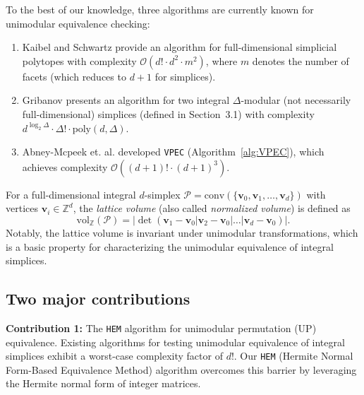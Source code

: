 \documentclass[reqno, 12pt]{article}
\theoremstyle{mydefinition}
\theoremstyle{myremark}
\numberwithin{algorithm}{section}
\begin{document}
To the best of our knowledge, three algorithms are currently known for unimodular equivalence checking:
\begin{enumerate}
    \item Kaibel and Schwartz \cite[Proposition 4]{Kaibel} provide an algorithm for full-dimensional simplicial polytopes with complexity $\mathcal O(d!\cdot d^2\cdot m^2)$, where $m$ denotes the number of facets (which reduces to $d+1$ for simplices).
    \item Gribanov \cite[Theorem 2]{Gribanov} presents an algorithm for two integral $\Delta$-modular (not necessarily full-dimensional) simplices (defined in Section~3.1) with complexity $d^{\log_2 \Delta} \cdot \Delta ! \cdot \mathrm{poly}(d,\Delta)$.
    \item Abney-Mcpeek et. al. \cite{Abney-Mcpeek} developed \texttt{VPEC} (Algorithm~\ref{alg:VPEC}), which achieves complexity $\mathcal O((d+1)!\cdot (d+1)^3)$.
\end{enumerate}


For a full-dimensional integral \( d \)-simplex \( \mathcal P = \text{conv}(\{ \mathbf{v}_0, \mathbf{v}_1, \dots, \mathbf{v}_d \}) \) with vertices \( \mathbf{v}_i \in \mathbb{Z}^d \), the \emph{lattice volume} (also called \emph{normalized volume}) is defined as
\[
\text{vol}_{\mathbb{Z}}(\mathcal P) = \left| \det\left( \mathbf{v}_1 - \mathbf{v}_0 | \mathbf{v}_2 - \mathbf{v}_0 | \dots | \mathbf{v}_d - \mathbf{v}_0\right) \right|.
\]
Notably, the lattice volume is invariant under unimodular transformations, which is a basic property for characterizing the unimodular equivalence of integral simplices.


\subsection{Two major contributions}

\textbf{Contribution 1:} The \texttt{HEM} algorithm for unimodular permutation (UP) equivalence.
Existing algorithms for testing unimodular equivalence of integral simplices
\cite{Kaibel,Gribanov,Abney-Mcpeek} exhibit a worst-case complexity factor of $d!$.
Our \texttt{HEM} (Hermite Normal Form-Based Equivalence Method) algorithm overcomes this barrier
by leveraging the Hermite normal form of integer matrices.
\end{document}
